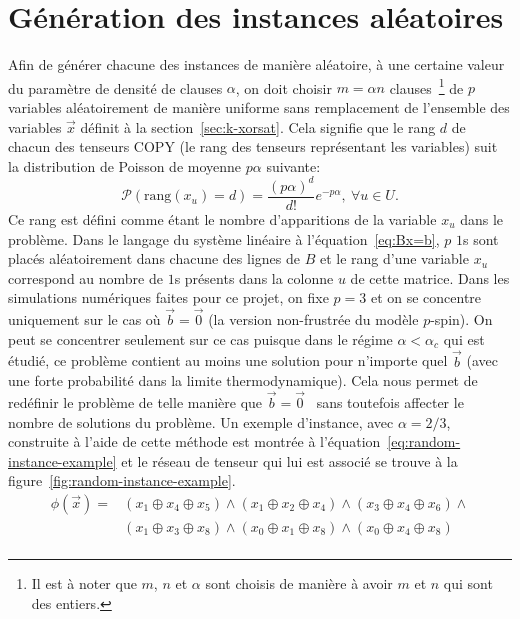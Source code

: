 \section{Génération des instances aléatoires}\label{sec:random-instances}
Afin de générer chacune des instances de manière aléatoire, à une certaine valeur du paramètre de densité de clauses $\alpha$, on doit choisir $m = \alpha n$ clauses~\footnote{Il est à noter que $m$, $n$ et $\alpha$ sont choisis de manière à avoir $m$ et $n$ qui sont des entiers.} de $p$ variables aléatoirement de manière uniforme sans remplacement de l'ensemble des variables $\vec{x}$ définit à la section~\ref{sec:k-xorsat}.
Cela signifie que le rang $d$ de chacun des tenseurs COPY (le rang des tenseurs représentant les variables) suit la distribution de Poisson de moyenne $p\alpha$ suivante: %
\begin{equation}\label{eq:poisson}
    \mathcal{P}(\text{rang}(x_u) = d) = \frac{(p\alpha)^d}{d!} e^{-p\alpha}\mathrm{, }\ \forall u \in U.
\end{equation}
Ce rang est défini comme étant le nombre d'apparitions de la variable $x_u$ dans le problème.
Dans le langage du système linéaire à l'équation~\ref{eq:Bx=b}, $p$ $1$s sont placés aléatoirement dans chacune des lignes de $B$ et le rang d'une variable $x_u$ correspond au nombre de $1$s présents dans la colonne $u$ de cette matrice.
Dans les simulations numériques faites pour ce projet, on fixe $p = 3$ et on se concentre uniquement sur le cas où $\vec{b} = \vec{0}$ (la version non-frustrée du modèle $p$-spin).
On peut se concentrer seulement sur ce cas puisque dans le régime $\alpha < \alpha_c$ qui est étudié, ce problème contient au moins une solution pour n'importe quel $\vec{b}$ (avec une forte probabilité dans la limite thermodynamique).
Cela nous permet de redéfinir le problème de telle manière que $\vec{b} = \vec{0}$~\cite{mezard_alternative_2002, braunstein_complexity_2002} sans toutefois affecter le nombre de solutions du problème.
Un exemple d'instance, avec $\alpha = 2/3$, construite à l'aide de cette méthode est montrée à l'équation~\ref{eq:random-instance-example} et le réseau de tenseur qui lui est associé se trouve à la figure~\ref{fig:random-instance-example}.
\begin{equation}\label{eq:random-instance-example}
    \begin{split}
        \phi(\vec{x}) = &(x_1 \oplus x_4 \oplus x_5) \wedge (x_1 \oplus x_2 \oplus x_4) \wedge (x_3 \oplus x_4 \oplus x_6) \wedge\\
        &(x_1 \oplus x_3 \oplus x_8) \wedge (x_0 \oplus x_1 \oplus x_8) \wedge (x_0 \oplus x_4 \oplus x_8)\\
    \end{split}
\end{equation}
